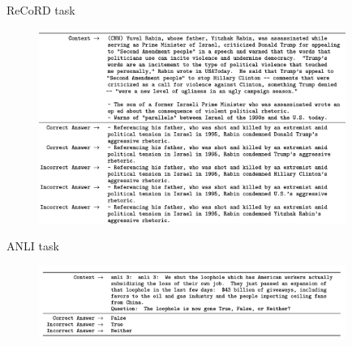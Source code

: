 
\begin{vbframe}{ReCoRD task}

\vfill

	\begin{figure}
		\centering
		\includegraphics[width=10cm]{figure/recordformat.png}
	\end{figure}

\vfill

\end{vbframe}




\begin{vbframe}{ANLI task}

\vfill

	\begin{figure}
		\centering
		\includegraphics[width=10cm]{figure/anliformat.png}
	\end{figure}

\vfill

\end{vbframe}




